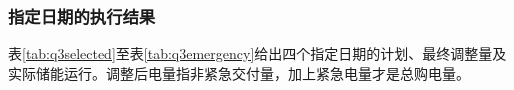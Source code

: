 \subsubsection{指定日期的执行结果}
表\ref{tab:q3selected}至表\ref{tab:q3emergency}给出四个指定日期的计划、最终调整量及实际储能运行。调整后电量指非紧急交付量，加上紧急电量才是总购电量。
\begin{table}[htbp]\centering\scriptsize
\caption{指定日期的电量、总费用及首尾储电量（电量单位：kWh）}\label{tab:q3selected}
\resizebox{\textwidth}{!}{}
\end{table}
\begin{table}[htbp]\centering\scriptsize
\caption{指定时段的原计划与最终调整电量（kWh）}\label{tab:q3purchase}
\resizebox{\textwidth}{!}{}
\end{table}
\begin{table}[htbp]\centering\scriptsize
\caption{指定日期各四小时区间的实际充放电量（kWh）}\label{tab:q3storage}
\resizebox{\textwidth}{!}{}
\end{table}
\begin{table}[htbp]\centering\small
\caption{指定日期连续紧急购电区间及电量}\label{tab:q3emergency}

\end{table}



